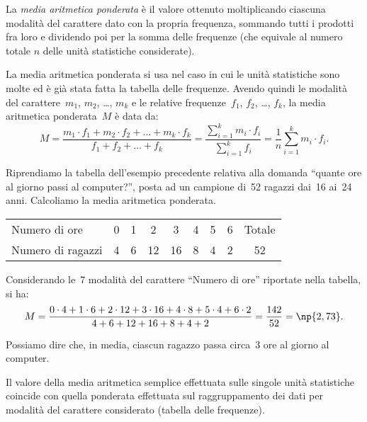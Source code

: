\begin{definizione}
La \emph{media aritmetica ponderata} è il valore ottenuto moltiplicando ciascuna modalità del carattere
dato con la propria frequenza, sommando tutti i prodotti fra loro e dividendo poi per la somma delle frequenze
(che equivale al numero totale $n$ delle unità statistiche considerate).
\end{definizione}

La media aritmetica ponderata si usa nel caso in cui le unità statistiche sono molte ed è già stata fatta la tabella delle frequenze. Avendo quindi le modalità del carattere~$m_1$, $m_2$, \ldots, $m_k$ e le relative frequenze~$f_1$, $f_2$, \ldots, $f_k$, la media aritmetica ponderata~$M$ è data da:
\begin{equation*}
M=\frac{m_1\cdot f_1+m_2\cdot f_2+ \dots +m_k\cdot f_k}{f_1+f_2+ \dots +f_k}=\frac{\sum_{i=1}^k m_i\cdot f_i}{\sum_{i=1}^k f_i}=\frac{1}{n}\sum_{i=1}^k m_i\cdot f_i.
\end{equation*}

\begin{exrig}
 \begin{esempio}

Riprendiamo la tabella dell'esempio precedente relativa alla domanda ``quante ore al giorno passi al computer?'',
posta ad un campione di~52 ragazzi dai~16 ai~24 anni. Calcoliamo la media aritmetica ponderata.
\begin{center}
 \begin{tabular}{lcccccccc}
 \toprule
 Numero di ore & 0 & 1 & 2 & 3 & 4 & 5 & 6 & Totale\\
 Numero di ragazzi & 4 & 6 & 12 & 16 & 8 & 4 & 2 & 52\\
 \bottomrule
\end{tabular}
\end{center}

Considerando le~7 modalità del carattere ``Numero di ore'' riportate nella tabella, si ha:
\begin{equation*}
M=\frac{0\cdot 4+1\cdot 6+2\cdot 12+3\cdot 16+4\cdot 8+5\cdot 4+6\cdot 2}{4+6+12+16+8+4+2}=\frac{142}{52}=\np{2,73}.
\end{equation*}

Possiamo dire che, in media, ciascun ragazzo passa circa~3 ore al giorno al computer.
\end{esempio}
\end{exrig}

Il valore della media aritmetica semplice effettuata sulle singole unità statistiche coincide con quella ponderata effettuata sul raggruppamento dei dati per modalità del carattere considerato (tabella delle frequenze).

